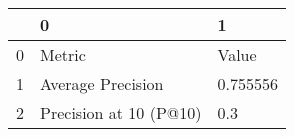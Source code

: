 \begin{tabular}{lll}
\toprule
{} &                       0 &         1 \\
\midrule
0 &                  Metric &     Value \\
1 &       Average Precision &  0.755556 \\
2 &  Precision at 10 (P@10) &       0.3 \\
\bottomrule
\end{tabular}
